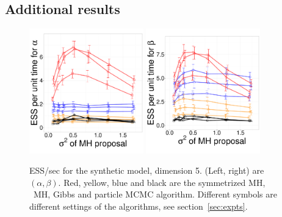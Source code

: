 \subsection{Additional results}
\vspace{-.4in}
  \begin{figure}[H]
  \centering
  \begin{minipage}[h!]{0.65\linewidth}
  \centering
    \includegraphics [width=0.44\textwidth, angle=0]{figs/exp_5_alpha.pdf}
    \includegraphics [width=0.44\textwidth, angle=0]{figs/exp_5_beta.pdf}
  \end{minipage}
  \begin{minipage}[!hp]{0.33\linewidth}
    \caption{ESS/sec for the synthetic  model, dimension 5. (Left, right) 
      are $(\alpha, \beta)$. Red, yellow, blue and black are the symmetrized MH,
  \naive\ MH, Gibbs and particle MCMC algorithm. Different symbols are
different settings of the algorithms, see section~\ref{sec:expts}.}
     \label{fig:ESS_EXP_D5}
  \end{minipage}
  \end{figure}

